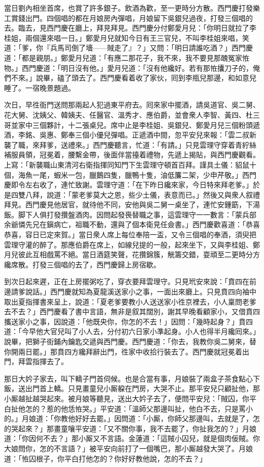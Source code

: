 當日劉內相坐首席，也賞了許多銀子。飲酒為歡，至一更時分方散。西門慶打發樂工賞錢出門。四個唱的都在月娘房內彈唱，月娘留下吳銀兒過夜，打發三個唱的去。臨去，見西門慶在廳上，拜見拜見。西門慶分付鄭愛月兒：「你明日就拉了李桂姐，兩個還來唱一日。」鄭愛月兒就知今日有王三官兒，不叫李桂姐來唱，{}笑道：「爹，你『兵馬司倒了墻——賊走了』？」又問：「明日請誰吃酒？」西門慶道：「都是親朋。」鄭愛月兒道：「有應二那花子，我不來，我不要見那醜冤家恠物。」西門慶道：「明日沒有他。」愛月兒道：「沒有他纔好。若有那恠攮刀子的，俺們不來。」說畢，磕了頭去了。西門慶看着收了家伙，囘到李瓶兒那邊，和如意兒睡了。一宿晚景題過。

次日，早徃衙門送問那兩起人犯過東平府去。囘來家中擺酒，請吳道官、吳二舅、花大舅、沈姨父、韓姨夫、任醫官、溫秀才、應伯爵，並會衆人李智、黃四、杜三哥並家中三個夥計，十二張桌兒。席中止是李桂姐、吳銀兒、鄭愛月兒三個粉頭遞酒，李銘、吳惠、鄭奉三個小優兒彈唱。正遞酒中間，忽平安兒來報：「雲二叔新襲了職，來拜爹，送禮來。」西門慶聽言，忙道：「有請。」只見雲理守穿着青紵絲補服員領，冠冕着，腰繫金帶，後面伴當擡着禮物，先遞上揭貼，與西門慶觀看。上寫：「新襲職山東清河右衛指揮同知門下生雲理守頓首百拜。謹具土儀：貂鼠十個，海魚一尾，蝦米一包，臘鵝四隻，臘鴨十隻，油低簾二架，少申芹敬。」西門慶即令左右收了，連忙致謝。雲理守道：「在下昨日纔來家，今日特來拜老爹。」於是四雙八拜，說道：「蒙老爹莫大之恩，些少土儀，表意而已。」然後又與衆人叙禮拜見。西門慶見他居官，就待他不同，安他與吳二舅一桌坐了，連忙安鍾筯，下湯飯。脚下人俱打發攢盤酒肉。因問起發䘮替職之事，這雲理守一一數言：「蒙兵部余爺憐先兄在鎭病亡，祖職不動，還與了個本衛見任僉書。」西門慶歡喜道：「恭喜恭喜，容日已定來賀。」當日衆人席上每位奉陪一盃，又令三個唱的奉酒，須臾把雲理守灌的醉了。那應伯爵在席上，如線兒提的一般，起來坐下，又與李桂姐、鄭月兒彼此互相戲罵不絕。當日酒筵笑聲，花攢錦簇，觥籌交錯，耍頑至二更時分方纔席散。打發三個唱的去了，西門慶歸上房宿歇。

到次日起來遲，正在上房擺粥吃了，穿衣要拜雲理守。只見玳安來說：「賁四在前邊請爹說話。」西門慶就知為夏龍溪送家小之事，一面出來廳上。只見賁四向袖中取出夏指揮書來呈上，說道：「夏老爹要教小人送送家小徃京裡去，小人稟問老爹去不去？」西門慶看了書中言語，無非是叙其闊別，謝其早晚看顧家小，又借賁四攜送家小之事，因說道：「他既央你，你怎的不去！」因問：「幾時起身？」賁四道：「今早他大官兒叫了小人去，分付初六日家小準起身。小人也得半月纔囘來。」說畢，把獅子街鋪內鑰匙交遞與西門慶。西門慶道：「你去，我教你吳二舅來，替你開兩日罷。」那賁四方纔拜辭出門，徃家中收拾行裝去了。西門慶就冠冕着出門，拜雲指揮去了。

那日大妗子家去，叫下轎子門首伺候。也是合當有事，月娘裝了兩盒子茶食點心下飯，送出門首上轎。只見畫童兒小厮躱在門房，大哭不止。那平安兒只顧扯他，那小厮越扯越哭起來。{}{}被月娘等聽見，送出大妗子去了，便問平安兒：「賊囚，你平白扯他怎的？惹的他恁恠哭。」平安道：「溫師父那邊叫扯，他白不去，只是罵小的。」月娘道：「你教他好好去罷。」因問道：「小厮，你師父那邊叫，去就是了，怎的哭起來？」那畫童嚷平安道：「又不關你事，我不去罷了，你扯我怎的？」月娘道：「你因何不去？」那小厮又不言語。金蓮道：「這賊小囚兒，就是個肉佞賊。你大娘問你，怎的不言語？」被平安向前打了一個嘴巴，{}那小厮越發大哭了。月娘道：「恠囚根子，你平白打他怎的？你好好教他說，怎的不去？」

